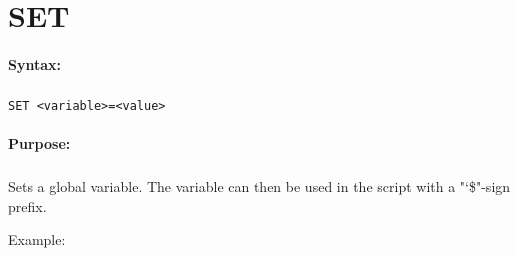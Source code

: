
\newpage
\section{SET}
\label{cmd:SET}

\paragraph{Syntax:}
\subparagraph{}
\texttt{SET <variable>=<value>}

\paragraph{Purpose:}
\subparagraph{}
Sets a global variable. The variable can then be 
used in the script with a "\char`\$"-sign prefix.

Example:

